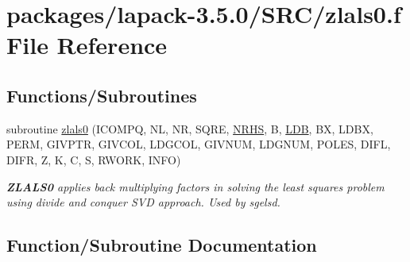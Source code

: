 \hypertarget{zlals0_8f}{}\section{packages/lapack-\/3.5.0/\+S\+R\+C/zlals0.f File Reference}
\label{zlals0_8f}
\subsection*{Functions/\+Subroutines}
\begin{DoxyCompactItemize}
\item 
subroutine \hyperlink{zlals0_8f_a339359328527a74dde2fe35641c048c9}{zlals0} (I\+C\+O\+M\+P\+Q, N\+L, N\+R, S\+Q\+R\+E, \hyperlink{example__user_8c_aa0138da002ce2a90360df2f521eb3198}{N\+R\+H\+S}, B, \hyperlink{example__user_8c_a50e90a7104df172b5a89a06c47fcca04}{L\+D\+B}, B\+X, L\+D\+B\+X, P\+E\+R\+M, G\+I\+V\+P\+T\+R, G\+I\+V\+C\+O\+L, L\+D\+G\+C\+O\+L, G\+I\+V\+N\+U\+M, L\+D\+G\+N\+U\+M, P\+O\+L\+E\+S, D\+I\+F\+L, D\+I\+F\+R, Z, K, C, S, R\+W\+O\+R\+K, I\+N\+F\+O)
\begin{DoxyCompactList}\small\item\em {\bfseries Z\+L\+A\+L\+S0} applies back multiplying factors in solving the least squares problem using divide and conquer S\+V\+D approach. Used by sgelsd. \end{DoxyCompactList}\end{DoxyCompactItemize}


\subsection{Function/\+Subroutine Documentation}
\hypertarget{zlals0_8f_a339359328527a74dde2fe35641c048c9}{}
